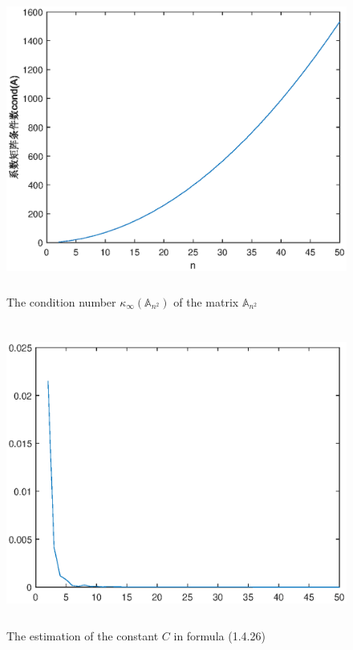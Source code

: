 \documentclass[UTF8,a4paper,10pt]{ctexart}
\begin{document}
\begin{figure}[ht]
    \centering
    \includegraphics[width=14cm,height=10cm]{1.1_condition_number.eps}
    \caption{The condition number $\kappa_{\infty}(\mathbb{A}_{n^2})$ of the matrix $\mathbb{A}_{n^2}$}
\end{figure}
\begin{figure}[ht]
    \centering
    \includegraphics[width=14cm,height=10cm]{1.1_estimation.eps}
    \caption{The estimation of the constant $C$ in formula (1.4.26)}
\end{figure}
\end{document}
